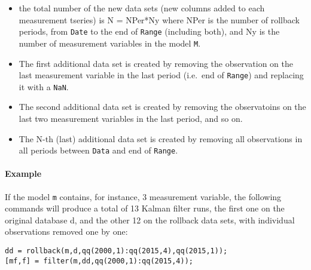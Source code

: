 \begin{itemize}
\item
  the total number of the new data sets (new columns added to each
  measurement tseries) is N = NPer*Ny where NPer is the number of
  rollback periods, from \texttt{Date} to the end of \texttt{Range}
  (including both), and Ny is the number of measurement variables in the
  model \texttt{M}.
\item
  The first additional data set is created by removing the observation
  on the last measurement variable in the last period (i.e.~end of
  \texttt{Range}) and replacing it with a \texttt{NaN}.
\item
  The second additional data set is created by removing the observatoins
  on the last two measurement variables in the last period, and so on.
\item
  The N-th (last) additional data set is created by removing all
  observations in all periods between \texttt{Data} and end of
  \texttt{Range}.
\end{itemize}

\paragraph{Example}\label{example}

If the model \texttt{m} contains, for instance, 3 measurement variable,
the following commands will produce a total of 13 Kalman filter runs,
the first one on the original database d, and the other 12 on the
rollback data sets, with individual observations removed one by one:

\begin{verbatim}
dd = rollback(m,d,qq(2000,1):qq(2015,4),qq(2015,1));
[mf,f] = filter(m,dd,qq(2000,1):qq(2015,4));
\end{verbatim}


